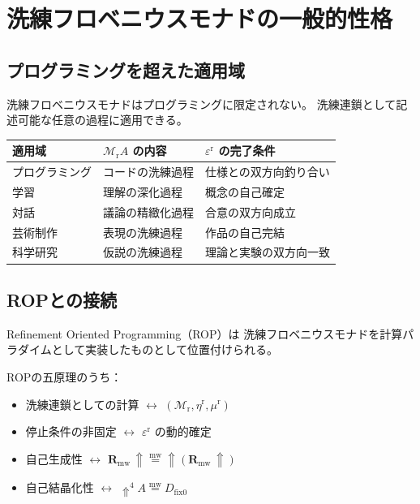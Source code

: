 \documentclass[11pt,a4paper]{article}
\theoremstyle{definition}
\newcommand{\mweq}{\mathrel{\overset{\mathrm{mw}}{=}}}
\newcommand{\dfix}{D_{\mathrm{fix}0}}
\newcommand{\metanegation}{\Uparrow}
\newcommand{\Rmw}{\mathbf{R}_{\mathrm{mw}}}
\newcommand{\Mr}{\mathcal{M}_{\mathrm{r}}}
\newcommand{\etar}{\eta^{\mathrm{r}}}
\newcommand{\mur}{\mu^{\mathrm{r}}}
\newcommand{\epsr}{\varepsilon^{\mathrm{r}}}
\begin{document}
\section{洗練フロベニウスモナドの一般的性格}

\subsection{プログラミングを超えた適用域}

洗練フロベニウスモナドはプログラミングに限定されない。
洗練連鎖として記述可能な任意の過程に適用できる。

\begin{center}
\begin{tabular}{lll}
\hline
\textbf{適用域} & \textbf{$\Mr A$ の内容} & \textbf{$\epsr$ の完了条件} \\
\hline
プログラミング & コードの洗練過程 & 仕様との双方向釣り合い \\
学習 & 理解の深化過程 & 概念の自己確定 \\
対話 & 議論の精緻化過程 & 合意の双方向成立 \\
芸術制作 & 表現の洗練過程 & 作品の自己完結 \\
科学研究 & 仮説の洗練過程 & 理論と実験の双方向一致 \\
\hline
\end{tabular}
\end{center}

\subsection{ROPとの接続}

Refinement Oriented Programming（ROP）\cite{Chiba2026_rop}は
洗練フロベニウスモナドを計算パラダイムとして実装したものとして位置付けられる。

ROPの五原理のうち：

\begin{itemize}
  \item 洗練連鎖としての計算 $\leftrightarrow$ $(\Mr, \etar, \mur)$
  \item 停止条件の非固定 $\leftrightarrow$ $\epsr$ の動的確定
  \item 自己生成性 $\leftrightarrow$ $\Rmw\,\metanegation \mweq \metanegation(\Rmw\,\metanegation)$
  \item 自己結晶化性 $\leftrightarrow$ $\metanegation^4 A \mweq \dfix$
\end{itemize}
\end{document}
